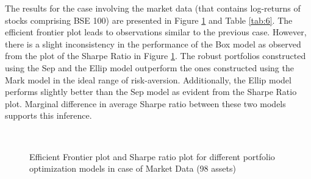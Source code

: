 The results for the case involving the market data (that contains log-returns of stocks comprising BSE 100) are  presented in Figure \ref{fig:6} and Table \ref{tab:6}. The efficient frontier plot leads to observations similar to the previous case. However, there is a slight inconsistency in the performance of the Box model as observed from the plot of the Sharpe Ratio in Figure \ref{fig:6}. The robust portfolios constructed using the Sep and the Ellip model outperform the ones constructed using the Mark model in the ideal range of risk-aversion. Additionally, the Ellip model performs slightly better than the Sep model as evident from the Sharpe Ratio plot. Marginal difference in average Sharpe ratio between these two models supports this inference.
\begin{figure}[!h]
    
    
     \hfill
   \\
   \caption{Efficient Frontier plot and Sharpe ratio plot for different portfolio optimization models in case of Market Data (98 assets)}
   \label{fig:6}
\end{figure}

